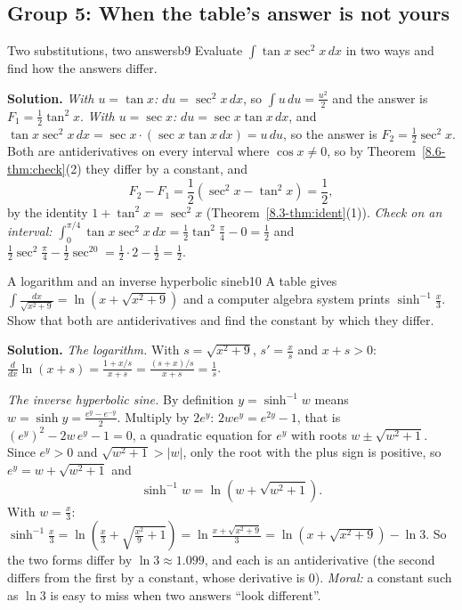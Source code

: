 \documentclass[11pt]{article}
\begin{document}
\subsection*{Group 5: When the table's answer is not yours}

\begin{exmp}{Two substitutions, two answers}{b9}
Evaluate $\displaystyle\int\tan x\sec^2x\,dx$ in two ways and find how the answers differ.

\textbf{Solution.} \emph{With $u=\tan x$:} $du=\sec^2x\,dx$, so $\int u\,du=\frac{u^2}2$ and the answer is $F_1=\frac12\tan^2x$. \emph{With $u=\sec x$:} $du=\sec x\tan x\,dx$, and $\tan x\sec^2x\,dx=\sec x\cdot(\sec x\tan x\,dx)=u\,du$, so the answer is $F_2=\frac12\sec^2x$. Both are antiderivatives on every interval where $\cos x\ne0$, so by Theorem~\ref{8.6-thm:check}(2) they differ by a constant, and
\[F_2-F_1=\frac12\left(\sec^2x-\tan^2x\right)=\frac12 ,\]
by the identity $1+\tan^2x=\sec^2x$ (Theorem~\ref{8.3-thm:ident}(1)). \emph{Check on an interval:} $\int_0^{\pi/4}\tan x\sec^2x\,dx=\frac12\tan^2\frac\pi4-0=\frac12$ and $\frac12\sec^2\frac\pi4-\frac12\sec^20=\frac12\cdot2-\frac12=\frac12$.
\end{exmp}

\begin{exmp}{A logarithm and an inverse hyperbolic sine}{b10}
A table gives $\displaystyle\int\frac{dx}{\sqrt{x^2+9}}=\ln\left(x+\sqrt{x^2+9}\right)$ and a computer algebra system prints $\sinh^{-1}\frac x3$. Show that both are antiderivatives and find the constant by which they differ.

\textbf{Solution.} \emph{The logarithm.} With $s=\sqrt{x^2+9}$, $s'=\frac xs$ and $x+s>0$: $\frac d{dx}\ln(x+s)=\frac{1+x/s}{x+s}=\frac{(s+x)/s}{x+s}=\frac1s$.

\emph{The inverse hyperbolic sine.} By definition $y=\sinh^{-1}w$ means $w=\sinh y=\frac{e^y-e^{-y}}2$. Multiply by $2e^y$: $2we^y=e^{2y}-1$, that is $\left(e^y\right)^2-2w\,e^y-1=0$, a quadratic equation for $e^y$ with roots $w\pm\sqrt{w^2+1}$. Since $e^y>0$ and $\sqrt{w^2+1}>\lvert w\rvert$, only the root with the plus sign is positive, so $e^y=w+\sqrt{w^2+1}$ and
\[\sinh^{-1}w=\ln\left(w+\sqrt{w^2+1}\right).\]
With $w=\frac x3$: $\sinh^{-1}\frac x3=\ln\left(\frac x3+\sqrt{\frac{x^2}9+1}\right)=\ln\frac{x+\sqrt{x^2+9}}3=\ln\left(x+\sqrt{x^2+9}\right)-\ln3$.
So the two forms differ by $\ln3\approx1.099$, and each is an antiderivative (the second differs from the first by a constant, whose derivative is $0$). \emph{Moral:} a constant such as $\ln3$ is easy to miss when two answers ``look different''.
\end{exmp}
\end{document}
